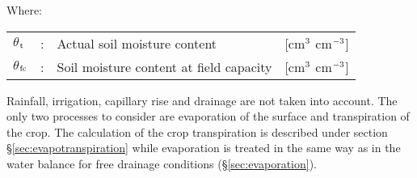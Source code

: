 Where:\\[5pt]
\begin{tabularx}{\textwidth}{llXr}
	$\theta$$_{{\rm t}}$ &:& Actual soil moisture content & [cm$^{{\rm 3}}$ cm$^{{\rm -3}}$]\\
	$\theta$$_{{\rm fc}}$ &:& Soil moisture content at field capacity & [cm$^{{\rm 3}}$ cm$^{{\rm -3}}$]\\
\end{tabularx}

Rainfall, irrigation, capillary rise and drainage are not taken into account. The only two processes to consider are evaporation of the surface and transpiration of the crop. The calculation of the crop transpiration is described under section  \S \ref{sec:evapotranspiration} while evaporation is treated in the same way as in the water balance for free drainage conditions (\S \ref{sec:evaporation}).

